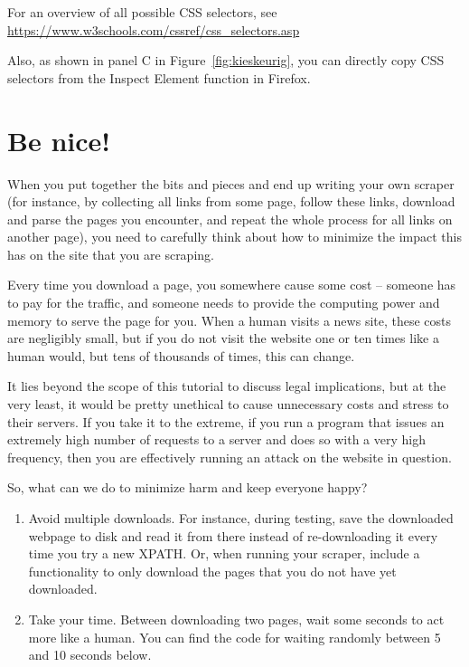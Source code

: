 \documentclass[a4paper,12pt]{book}
\begin{document}
For an overview of all possible CSS selectors, see
\url{https://www.w3schools.com/cssref/css_selectors.asp}

Also, as shown in panel C in Figure~\ref{fig:kieskeurig}, you can directly copy CSS selectors from the Inspect Element function in Firefox.


\section{Be nice!}
\label{sec:benice}

When you put together the bits and pieces and end up writing your own scraper (for instance, by collecting all links from some page, follow these links, download and parse the pages you encounter, and repeat the whole process for all links on another page), you need to carefully think about how to minimize the impact this has on the site that you are scraping.

Every time you download a page, you somewhere cause some cost -- someone has to pay for the traffic, and someone needs to provide the computing power and memory to serve the page for you. When a human visits a news site, these costs are negligibly small, but if you do not visit the website one or ten times like a human would, but tens of thousands of times, this can change. 

It lies beyond the scope of this tutorial to discuss legal implications, but at the very least, it would be pretty unethical to cause unnecessary costs and stress to their servers. If you take it to the extreme, if you run a program that issues an extremely high number of requests to a server and does so with a very high frequency, then you are effectively running an attack on the website in question.

So, what can we do to minimize harm and keep everyone happy?

\begin{enumerate}
	\item Avoid multiple downloads. For instance, during testing, save the downloaded webpage to disk and read it from there instead of re-downloading it every time you try a new XPATH. Or, when running your scraper, include a functionality to only download the pages that you do not have yet downloaded.
	
	\item Take your time. Between downloading two pages, wait some seconds to act more like a human. You can find the code for waiting randomly between 5 and 10 seconds below. 
\end{enumerate}
\end{document}
